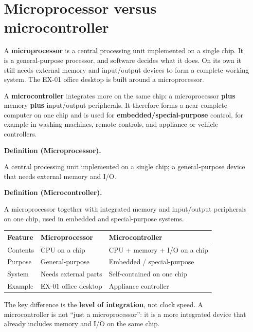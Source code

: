 \documentclass[11pt]{article}
\newenvironment{definitionbox}[1]{%
  \par\noindent\textbf{Definition (#1).}\ \itshape
}{\par\vspace{0.3em}}
\begin{document}
\section{Microprocessor versus microcontroller}
A \textbf{microprocessor} is a central processing unit implemented on a single
chip. It is a general-purpose processor, and software decides what it does.
On its own it still needs external memory and input/output devices to form a
complete working system. The EX-01 office desktop is built around a
microprocessor.

A \textbf{microcontroller} integrates more on the same chip: a microprocessor
\textbf{plus} memory \textbf{plus} input/output peripherals. It therefore
forms a near-complete computer on one chip and is used for
\textbf{embedded/special-purpose} control, for example in washing machines,
remote controls, and appliance or vehicle controllers.

\begin{definitionbox}{Microprocessor}
A central processing unit implemented on a single chip; a general-purpose
device that needs external memory and I/O.
\end{definitionbox}

\begin{definitionbox}{Microcontroller}
A microprocessor together with integrated memory and input/output peripherals
on one chip, used in embedded and special-purpose systems.
\end{definitionbox}

\begin{center}
\begin{tabular}{p{}p{}p{}}
\toprule
\textbf{Feature} & \textbf{Microprocessor} & \textbf{Microcontroller}\\
\midrule
Contents & CPU on a chip & CPU + memory + I/O on a chip\\
Purpose & General-purpose & Embedded / special-purpose\\
System & Needs external parts & Self-contained on one chip\\
Example & EX-01 office desktop & Appliance controller\\
\bottomrule
\end{tabular}
\end{center}

The key difference is the \textbf{level of integration}, not clock speed. A
microcontroller is not ``just a microprocessor'': it is a more integrated
device that already includes memory and I/O on the same chip.
\end{document}
